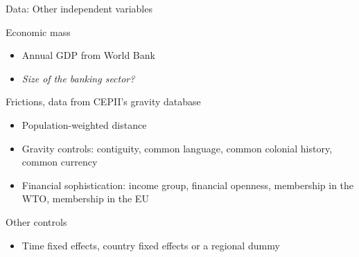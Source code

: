 \documentclass{beamer}
\begin{document}

\begin{frame}{Data: Other independent variables}
\begin{block}{Economic mass}
\begin{itemize}
\item Annual GDP from World Bank
\item \textit{Size of the banking sector?}
\end{itemize}
\end{block}
\begin{block}{Frictions, data from CEPII's gravity database}
\begin{itemize}
\item Population-weighted distance
\item Gravity controls: contiguity, common language, common colonial history, common currency
\item Financial sophistication: income group, financial openness, membership in the WTO, membership in the EU
\end{itemize}
\end{block}
\begin{block}{Other controls}
\begin{itemize}
\item Time fixed effects, country fixed effects or a regional dummy
\end{itemize}
\end{block}
\end{frame}
\end{document}
